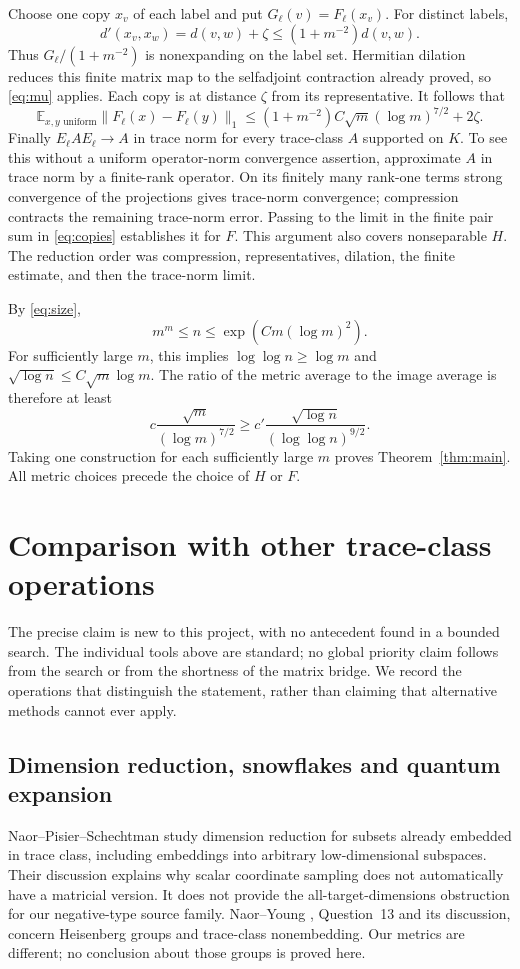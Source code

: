 \documentclass[11pt]{article}
\theoremstyle{remark}\newtheorem{remark}[theorem]{Remark}
\numberwithin{equation}{section}
\newcommand{\E}{\mathbb E}\newcommand{\Prob}{\mathbb P}
\newcommand{\norm}[1]{\lVert #1\rVert}
\begin{document}
Choose one copy $x_v$ of each label and put $G_\ell(v)=F_\ell(x_v)$.
For distinct labels,
\[
 d'(x_v,x_w)=d(v,w)+\zeta\le(1+m^{-2})d(v,w).
\]
Thus $G_\ell/(1+m^{-2})$ is nonexpanding on the label set. Hermitian
dilation reduces this finite matrix map to the selfadjoint contraction
already proved, so \eqref{eq:mu} applies. Each copy is at distance
$\zeta$ from its representative. It follows that
\begin{equation}\label{eq:copies}
 \E_{x,y\text{ uniform}}\norm{F_\ell(x)-F_\ell(y)}_1
 \le(1+m^{-2})C\sqrt m(\log m)^{7/2}+2\zeta.
\end{equation}
Finally $E_\ell A E_\ell\to A$ in trace norm for every trace-class
$A$ supported on $K$. To see this without a uniform operator-norm
convergence assertion, approximate $A$ in trace norm by a finite-rank
operator. On its finitely many rank-one terms strong convergence of the
projections gives trace-norm convergence; compression contracts the
remaining trace-norm error. Passing to the limit in the finite pair sum
in \eqref{eq:copies} establishes it for $F$. This argument also covers
nonseparable $H$. The reduction order was compression, representatives,
dilation, the finite estimate, and then the trace-norm limit.

By \eqref{eq:size},
\[
 m^m\le n\le\exp(Cm(\log m)^2).
\]
For sufficiently large $m$, this implies $\log\log n\ge\log m$ and
$\sqrt{\log n}\le C\sqrt m\log m$. The ratio of the metric average to
the image average is therefore at least
\[
 c\frac{\sqrt m}{(\log m)^{7/2}}
 \ge c'\frac{\sqrt{\log n}}{(\log\log n)^{9/2}}.
\]
Taking one construction for each sufficiently large $m$ proves
Theorem~\ref{thm:main}. All metric choices precede the choice of $H$ or $F$.

\section{Comparison with other trace-class operations}\label{sec:comparisons}
The precise claim is new to this project, with no antecedent found in a
bounded search. The individual tools above are standard; no global
priority claim follows from the search or from the shortness of the
matrix bridge. We record the operations that distinguish the statement,
rather than claiming that alternative methods cannot ever apply.

\subsection{Dimension reduction, snowflakes and quantum expansion}
Naor--Pisier--Schechtman \cite{NPS} study dimension reduction for subsets
already embedded in trace class, including embeddings into arbitrary
low-dimensional subspaces. Their discussion explains why scalar
coordinate sampling does not automatically have a matricial version.
It does not provide the all-target-dimensions obstruction for our
negative-type source family. Naor--Young \cite{NY}, Question~13 and its
discussion, concern Heisenberg groups and trace-class nonembedding. Our
metrics are different; no conclusion about those groups is proved here.
\end{document}
